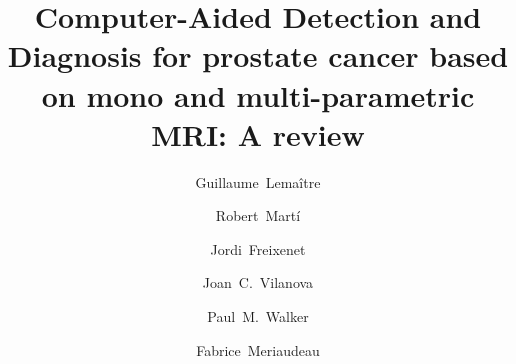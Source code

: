 \begin{frontmatter}



\title{Computer-Aided Detection and Diagnosis for prostate cancer based on mono and multi-parametric MRI: A review}


\author[label1,label3]{Guillaume~Lema\^itre}
\author[label3]{Robert~Mart\'i}
\author[label3]{Jordi~Freixenet}
\author[label4]{Joan~C.~Vilanova}
\author[label2]{Paul~M.~Walker}
\author[label1]{Fabrice~Meriaudeau}


\address[label1]{\scriptsize LE2I-UMR CNRS 6306, Universit\'{e} de Bourgogne, 12 rue de la Fonderie, 71200 Le Creusot, France}
\address[label2]{\scriptsize LE2I-UMR CNRS 6306, Universit\'{e} de Bourgogne, Avenue Alain Savary, 21000 Dijon, France}
\address[label3]{\scriptsize ViCOROB, Universitat de Girona, Campus Montilivi, Edifici P4, 17071 Girona, Spain}
\address[label4]{\scriptsize Department of Magnetic Resonance, Cl\'inica Girona, Lorenzana 36, 17002 Girona, Spain}



\end{frontmatter}
